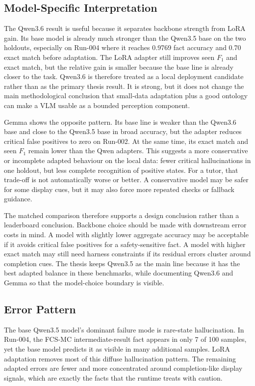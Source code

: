 \subsection{Model-Specific Interpretation}

The Qwen3.6 result is useful because it separates backbone strength from LoRA
gain. Its base model is already much stronger than the Qwen3.5 base on the two
holdouts, especially on Run-004 where it reaches 0.9769 fact accuracy and 0.70
exact match before adaptation. The LoRA adapter still improves seen \(F_1\) and
exact match, but the relative gain is smaller because the base line is already
closer to the task. Qwen3.6 is therefore treated as a local deployment
candidate rather than as the primary thesis result. It is strong, but it does
not change the main methodological conclusion that
small-data adaptation plus a good ontology can make a VLM usable as a bounded
perception component.

Gemma shows the opposite pattern. Its base line is weaker than the Qwen3.6
base and close to the Qwen3.5 base in broad accuracy, but the adapter reduces
critical false positives to zero on Run-002. At the same time, its exact match
and seen \(F_1\) remain lower than the Qwen adapters. This suggests a more
conservative or incomplete adapted behaviour on the local data: fewer critical
hallucinations in one holdout, but less complete recognition of positive
states. For a tutor, that trade-off is not automatically worse or better. A
conservative model may be safer for some display cues, but it may also force
more repeated checks or fallback guidance.

The matched comparison therefore supports a design conclusion rather than a
leaderboard conclusion. Backbone choice should be made with downstream error
costs in mind. A model with slightly lower aggregate accuracy may be acceptable
if it avoids critical false positives for a safety-sensitive fact. A model with
higher exact match may still need harness constraints if its residual errors
cluster around completion cues. The thesis keeps Qwen3.5 as the main line
because it has the best adapted balance in these benchmarks, while documenting
Qwen3.6 and Gemma so that the model-choice boundary is visible.

\subsection{Error Pattern}

The base Qwen3.5 model's dominant failure mode is rare-state hallucination. In
Run-004, the FCS-MC intermediate-result fact appears in only 7 of 100 samples,
yet the base model predicts it as visible in many additional samples. LoRA
adaptation removes most of this diffuse hallucination pattern. The remaining
adapted errors are fewer and more concentrated around completion-like display
signals, which are exactly the facts that the runtime treats with caution.

